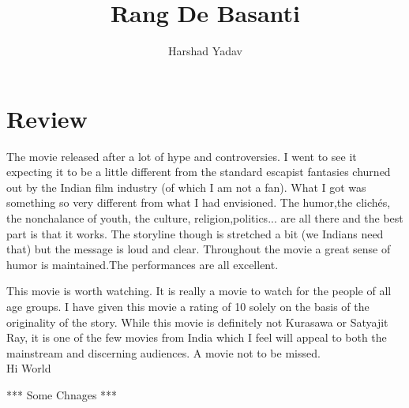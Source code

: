 \documentclass[a4paper,10pt]{article}
\title{Rang De Basanti}
\author{Harshad Yadav}
\begin{document}
\maketitle

\section{Review}
The movie released after a lot of hype and controversies. I went to see it expecting it to be a little different from the standard escapist fantasies churned out by the Indian film industry (of which I am not a fan). What I got was something so very different from what I had envisioned. The humor,the clichés, the nonchalance of youth, the culture, religion,politics... are all there and the best part is that it works. The storyline though is stretched a bit (we Indians need that) but the message is loud and clear. Throughout the movie a great sense of humor is maintained.The performances are all excellent.


This movie is worth watching. 
It is really a movie to watch for the people of all age groups. 
I have given this movie a rating of 10 solely on the basis of the originality of the story. While this movie is definitely not Kurasawa or Satyajit Ray, it is one of the few movies from India which I feel will appeal to both the mainstream and discerning audiences. A movie not to be missed. \\

Hi World

*** Some Chnages ***
\end{document}
